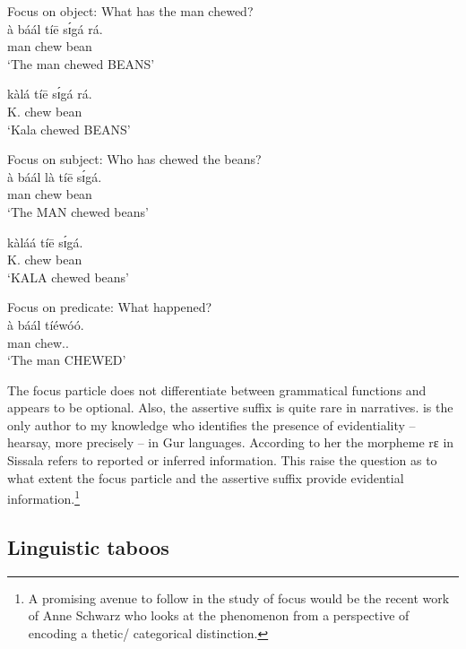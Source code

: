 \begin{exe}
\begin{exe}
\begin{exe}
{\begin{exe}
\begin{exe}
\begin{exe}
\begin{exe}
\begin{exe}
\begin{exe}
\begin{exe}
\begin{exe}
\begin{exe}
\begin{exe}
\begin{exe}
\begin{exe}
\begin{exe}
\begin{exe}
\begin{exe}
\begin{exe}
\begin{exe}
\begin{exe}
\begin{exe}
\begin{exe}
\begin{exe}
 \ea\label{ex:GRM-focus-obj}{\rm Focus on object: What has the man chewed?}\\
\gll   à báál tíē sɪ́gá rá.\\
   {\art} man chew bean {\foc}\\
\glt `The man chewed BEANS'

\gll  kàlá tíē sɪ́gá rá.\\
   K.   chew bean {\foc}\\
\glt `Kala chewed BEANS'

\ex\label{ex:GRM-focus-subj}{\rm Focus on subject: Who has chewed the beans?}\\
\gll   à báál là  tíē sɪ́gá.\\
    {\art} man {\foc} chew bean\\
\glt `The MAN chewed beans'



\gll  kàláá tíē sɪ́gá.\\
   K.   chew bean\\
\glt `KALA chewed beans'

\ex\label{ex:GRM-focus-pred}{\rm Focus on predicate: What happened?}\\
\gll à báál tíéwóó.\\
   {\art} man chew.{\pfv .\foc}\\
\glt `The man CHEWED'


\z 
 \z

The focus particle does not differentiate between  grammatical functions and 
appears to be optional.  Also,  the assertive suffix is quite rare 
in narratives.  \citet[94]{blas90} is the only author to my knowledge 
who identifies the presence  of  evidentiality --  hearsay, more precisely -- 
in Gur languages. According to her the morpheme {\sls rɛ} in Sissala refers to 
reported or inferred information. This raise the question as to what extent the 
focus particle and the assertive suffix provide evidential 
information.\footnote{A promising avenue to follow in the study of focus 
would be the recent work of Anne Schwarz  who looks at 
the phenomenon from a perspective of encoding a thetic/
categorical distinction.}


\subsection{Linguistic taboos}
\label{sec:GRM-ling-taboo}


\end{exe}
\end{exe}
\end{exe}
\end{exe}
\end{exe}
\end{exe}
\end{exe}
\end{exe}
\end{exe}
\end{exe}
\end{exe}
\end{exe}
\end{exe}
\end{exe}
\end{exe}
\end{exe}
\end{exe}
\end{exe}
\end{exe}
\end{exe}
\end{exe}}
\end{exe}
\end{exe}
\end{exe}
